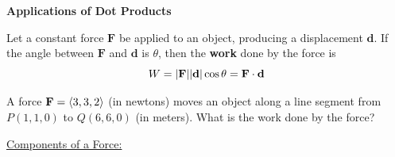 \documentclass[../mathNotesPreamble]{subfiles}
\begin{document}
  \textbf{Applications of Dot Products}

  \begin{defn*}[Work]
    Let a constant force $\mathbf{F}$ be applied to an object, producing a displacement $\mathbf{d}$. If the angle between $\mathbf{F}$ and $\mathbf{d}$ is $\theta$, then the \textbf{work} done by the force is
      \[W={\left\vert\mathbf{F}\right\vert}{\left\vert\mathbf{d}\right\vert}\cos\theta=\mathbf{F}\cdot \mathbf{d}\]
  \end{defn*}

  \begin{ex*}
    A force $\mathbf F={\left\langle 3,3,2 \right\rangle}$ (in newtons) moves an object along a line segment from $P(1,1,0)$ to $Q(6,6,0)$ (in meters). What is the work done by the force? 
  \end{ex*}
  
  \noindent
  \underline{Components of a Force:}
  \vspace*{0.5\baselineskip}
  
\end{document}
